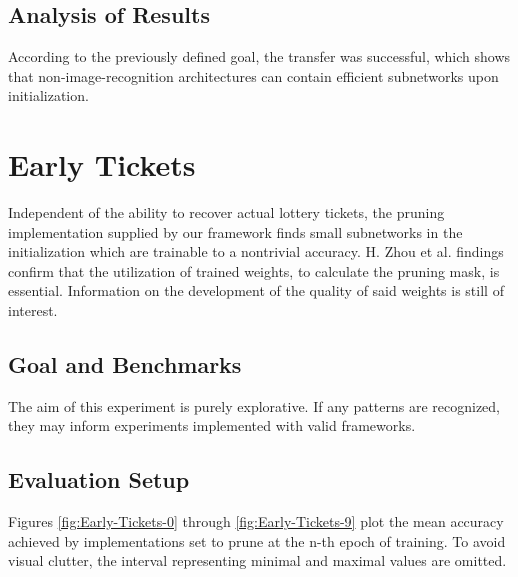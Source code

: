 \subsection*{Analysis of Results}
According to the previously defined goal, the transfer was successful, which shows that non-image-recognition architectures can contain efficient subnetworks upon initialization.

\newpage

\section{Early Tickets}
Independent of the ability to recover actual lottery tickets, the pruning implementation supplied by our framework finds small subnetworks in the initialization which are trainable to a nontrivial accuracy. H. Zhou et al. findings confirm that the utilization of trained weights, to calculate the pruning mask, is essential.\cite{Deconstructing_LTH} Information on the development of the quality of said weights is still of interest. 
\subsection*{Goal and Benchmarks}
The aim of this experiment is purely explorative. If any patterns are recognized, they may inform experiments implemented with valid frameworks.
\subsection*{Evaluation Setup}
Figures \ref{fig:Early-Tickets-0} through \ref{fig:Early-Tickets-9} plot the mean accuracy achieved by implementations set to prune at the n-th epoch of training. To avoid visual clutter, the interval representing minimal and maximal values are omitted. 
